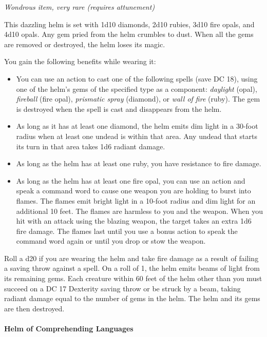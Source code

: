 \documentclass[
]{article}
\begin{document}
\emph{Wondrous item, very rare (requires attunement)}

This dazzling helm is set with 1d10 diamonds, 2d10 rubies, 3d10 fire
opals, and 4d10 opals. Any gem pried from the helm crumbles to dust.
When all the gems are removed or destroyed, the helm loses its magic.

You gain the following benefits while wearing it:

\begin{itemize}
\item
  You can use an action to cast one of the following spells (save DC
  18), using one of the helm's gems of the specified type as a
  component: \emph{daylight} (opal), \emph{fireball} (fire opal),
  \emph{prismatic spray} (diamond), or \emph{wall of fire} (ruby). The
  gem is destroyed when the spell is cast and disappears from the helm.
\item
  As long as it has at least one diamond, the helm emits dim light in a
  30-foot radius when at least one undead is within that area. Any
  undead that starts its turn in that area takes 1d6 radiant damage.
\item
  As long as the helm has at least one ruby, you have resistance to fire
  damage.
\item
  As long as the helm has at least one fire opal, you can use an action
  and speak a command word to cause one weapon you are holding to burst
  into flames. The flames emit bright light in a 10-foot radius and dim
  light for an additional 10 feet. The flames are harmless to you and
  the weapon. When you hit with an attack using the blazing weapon, the
  target takes an extra 1d6 fire damage. The flames last until you use a
  bonus action to speak the command word again or until you drop or stow
  the weapon.
\end{itemize}

Roll a d20 if you are wearing the helm and take fire damage as a result
of failing a saving throw against a spell. On a roll of 1, the helm
emits beams of light from its remaining gems. Each creature within 60
feet of the helm other than you must succeed on a DC 17 Dexterity saving
throw or be struck by a beam, taking radiant damage equal to the number
of gems in the helm. The helm and its gems are then destroyed.

\hypertarget{helm-of-comprehending-languages}{%
\paragraph{Helm of Comprehending
Languages}\label{helm-of-comprehending-languages}}
\end{document}
